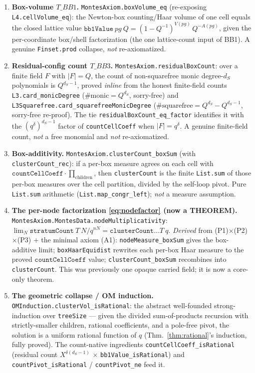 \documentclass[11pt]{article}
\theoremstyle{definition}
\theoremstyle{remark}
\begin{document}
\begin{enumerate}[label=\textup{(P\arabic*)},leftmargin=*]
\item\textbf{Box-volume $T\_BB1$.} \texttt{MontesAxiom.boxVolume\_eq} (re-exposing
\texttt{L4.cellVolume\_eq}): the Newton-box counting/Haar volume of one cell equals
the closed lattice value $\texttt{bb1Value}\ pg\ Q = (1-Q^{-1})^{V(pg)}\,Q^{-A(pg)}$,
given the per-coordinate box/shell factorization (the one lattice-count input of BB1).
A genuine \texttt{Finset.prod} collapse, \emph{not} re-axiomatized.

\item\textbf{Residual-config count $T\_BB3$.} \texttt{MontesAxiom.residualBoxCount}:
over a finite field $F$ with $|F|=Q$, the count of non-squarefree monic degree-$d_S$
polynomials is $Q^{d_S-1}$, proved \emph{inline} from the honest finite-field counts
\texttt{L3.card\_monicDegree} ($\#\text{monic}=Q^{d_S}$, sorry-free) and
\texttt{L3Squarefree.card\_squarefreeMonicDegree}
($\#\text{squarefree}=Q^{d_S}-Q^{d_S-1}$, sorry-free re-proof). The tie
\texttt{residualBoxCount\_eq\_factor} identifies it with the $(q^{\delta})^{d_S-1}$
factor of \texttt{countCellCoeff} when $|F|=q^{\delta}$. A genuine finite-field count,
\emph{not} a free monomial and \emph{not} re-axiomatized.

\item\textbf{Box-additivity.} \texttt{MontesAxiom.clusterCount\_boxSum} (with
\texttt{clusterCount\_rec}): if a per-box measure agrees on each cell with
$\texttt{countCellCoeff}\cdot\prod_{\text{children}}$, then \texttt{clusterCount} is
the finite \texttt{List.sum} of those per-box measures over the cell partition,
divided by the self-loop pivot. Pure \texttt{List.sum} arithmetic
(\texttt{List.map\_congr\_left}); \emph{not} a measure assumption.

\item\textbf{The per-node factorization \eqref{eq:nodefactor} (now a THEOREM).}
\texttt{MontesAxiom.MontesData.nodeMultiplicativity}: $\lim_N\texttt{stratumCount}\ T\ N/q^{nN}
= \texttt{clusterCount}\dots T\ q$. \emph{Derived} from (P1)$\times$(P2)$\times$(P3)
$+$ the minimal axiom (A1): \texttt{nodeMeasure\_boxSum} gives the box-additive limit;
\texttt{boxHaarEquidist} rewrites each per-box Haar measure to the proved
$\texttt{countCellCoeff}$ value; \texttt{clusterCount\_boxSum} recombines into
\texttt{clusterCount}. This was previously one opaque carried field; it is now a
core-only theorem.

\item\textbf{The geometric collapse / OM induction.}
\texttt{OMInduction.clusterVol\_isRational}: the abstract well-founded
strong-induction over \texttt{treeSize} --- given the divided sum-of-products
recursion with strictly-smaller children, rational coefficients, and a pole-free
pivot, the solution is a uniform rational function of $q$ (Thm.~\ref{thm:rational}'s
induction, fully proved). The count-native ingredients
\texttt{countCellCoeff\_isRational} (residual count $X^{\delta(d_S-1)}$ $\times$
\texttt{bb1Value\_isRational}) and \texttt{countPivot\_isRational} /
\texttt{countPivot\_ne} feed it.


\end{enumerate}
\end{document}
